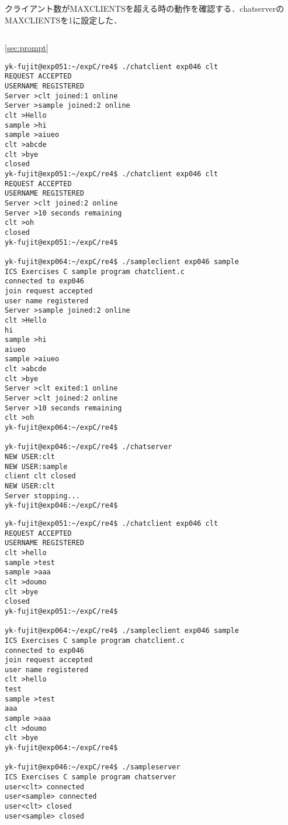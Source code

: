 \documentclass[a4j,10pt,titlepage]{jsarticle}
\begin{document}
クライアント数がMAXCLIENTSを超える時の動作を確認する．chatserverのMAXCLIENTSを1に設定した．
\begin{verbatim}

\end{verbatim}



\ref{sec:prompt}

\begin{verbatim}
yk-fujit@exp051:~/expC/re4$ ./chatclient exp046 clt
REQUEST ACCEPTED
USERNAME REGISTERED
Server >clt joined:1 online
Server >sample joined:2 online
clt >Hello
sample >hi
sample >aiueo
clt >abcde
clt >bye
closed
yk-fujit@exp051:~/expC/re4$ ./chatclient exp046 clt
REQUEST ACCEPTED
USERNAME REGISTERED
Server >clt joined:2 online
Server >10 seconds remaining
clt >oh
closed
yk-fujit@exp051:~/expC/re4$ 

yk-fujit@exp064:~/expC/re4$ ./sampleclient exp046 sample
ICS Exercises C sample program chatclient.c
connected to exp046
join request accepted
user name registered
Server >sample joined:2 online
clt >Hello
hi
sample >hi
aiueo
sample >aiueo
clt >abcde
clt >bye
Server >clt exited:1 online
Server >clt joined:2 online
Server >10 seconds remaining
clt >oh
yk-fujit@exp064:~/expC/re4$ 

yk-fujit@exp046:~/expC/re4$ ./chatserver 
NEW USER:clt
NEW USER:sample
client clt closed
NEW USER:clt
Server stopping...
yk-fujit@exp046:~/expC/re4$ 
\end{verbatim}

\begin{verbatim}
yk-fujit@exp051:~/expC/re4$ ./chatclient exp046 clt
REQUEST ACCEPTED
USERNAME REGISTERED
clt >hello
sample >test
sample >aaa
clt >doumo
clt >bye
closed
yk-fujit@exp051:~/expC/re4$ 

yk-fujit@exp064:~/expC/re4$ ./sampleclient exp046 sample
ICS Exercises C sample program chatclient.c
connected to exp046
join request accepted
user name registered
clt >hello
test
sample >test
aaa
sample >aaa
clt >doumo
clt >bye
yk-fujit@exp064:~/expC/re4$

yk-fujit@exp046:~/expC/re4$ ./sampleserver 
ICS Exercises C sample program chatserver
user<clt> connected
user<sample> connected
user<clt> closed
user<sample> closed
\end{verbatim}
\end{document}
